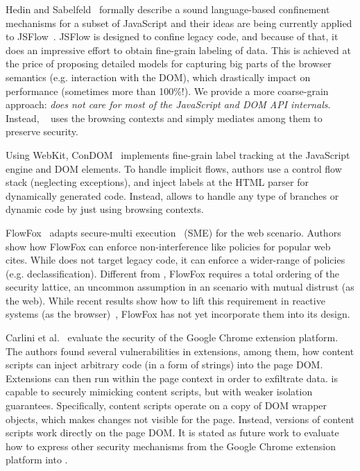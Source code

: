 Hedin and Sabelfeld~\cite{Hedin:2012} formally describe a sound language-based
confinement mechanisms for a subset of JavaScript and their ideas are being
currently applied to JSFlow~\cite{JSFlow}. %
JSFlow is designed to confine legacy code, and because of that, it does an
impressive effort to obtain fine-grain labeling of data. This is achieved at the
price of proposing detailed models for capturing big parts of the browser
semantics (e.g. interaction with the DOM), which drastically impact on
performance (sometimes more than 100\%!).  We provide a more coarse-grain
approach: \emph{\sys{} does not care for most of the JavaScript and DOM API
  internals}. Instead, \sys~ uses the browsing contexts and simply
mediates among them to preserve security.

Using WebKit, ConDOM~\cite{ConDOM} implements fine-grain label tracking at the
JavaScript engine and DOM elements. To handle implicit flows, authors use a
control flow stack (neglecting exceptions), and inject labels at the HTML parser
for dynamically generated code. Instead, \sys{} allows to handle any type of
branches or dynamic code by just using browsing contexts.

FlowFox~\cite{DeGroef:2012} adapts secure-multi execution~\cite{Devriese:2010}
(SME) for the web scenario. Authors show how FlowFox can enforce
non-interference like policies for popular web cites. While \sys{} does not
target legacy code, it can enforce a wider-range of policies
(e.g. declassification). Different from \sys{}, FlowFox requires a total
ordering of the security lattice, an uncommon assumption in an scenario with
mutual distrust (as the web). While recent results show how to lift this
requirement in reactive systems (as the browser)~\cite{ZanariniJR13}, FlowFox
has not yet incorporate them into its design.




Carlini et al.~\cite{Carlini:2012} evaluate the security of the Google Chrome
extension platform. The authors found several vulnerabilities in extensions, among them,
how content scripts can inject arbitrary code (in a form of strings) into the
page DOM. Extensions can then run within the page context in order
to exfiltrate data. \sys{} is capable to securely mimicking content scripts, but
with  weaker isolation guarantees.  Specifically, content scripts operate on a
copy of DOM wrapper objects, which makes changes not visible for the
page. Instead, \sys{} versions of content scripts work directly on the page DOM.
It is stated as future work to evaluate how to express other 
security mechanisms from the Google Chrome extension platform into \sys{}. 

 
 

